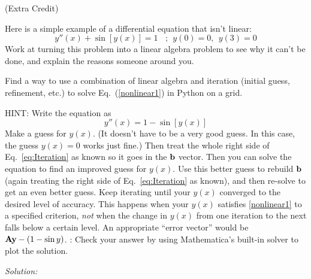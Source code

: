 \begin{enumerate}
\probtwo(Extra Credit) \label{P:2.4}
\begin{enumerate}
\subprob Here is a simple example of a differential equation
    that isn't linear: 
    \begin{equation}
        y''(x) + \sin{\left[y(x)\right]}=1~~~~;~~y(0)=0,~~y(3)=0
    \label{nonlinear1}
    \end{equation}
    Work at turning this problem into a linear algebra
    problem to see why it can't be done, and explain the
    reasons someone around you.


\subprob \label{P:2.4b} 

  Find a way to use a combination of linear algebra and iteration
  (initial guess, refinement, etc.) to solve Eq.~(\ref{nonlinear1}) in
  Python on a grid. 

    HINT: Write the equation as
    \begin{equation}\label{eq:Iteration}
        y''(x) = 1 - \sin \left[y(x)\right]
    \end{equation}
    Make a guess for $y(x)$. (It doesn't have to be a very good
    guess. In this case, the guess $y(x)=0$ works just fine.) Then
    treat the whole right side of Eq.~\eqref{eq:Iteration} as known so
    it goes in the $\bf b$ vector. Then you can solve the equation to
    find an improved guess for $y(x)$.  Use this better guess to
    rebuild $\bf b$ (again treating the right side of
    Eq.~\eqref{eq:Iteration} as known), and then re-solve to get an
    even better guess. Keep iterating until your $y(x)$ converged to
    the desired level of accuracy. This happens when your $y(x)$
    satisfies \eqref{nonlinear1} to a specified criterion, \emph{not}
    when the change in $y(x)$ from one iteration to the next falls
    below a certain level. An appropriate ``error vector'' would be
    ${\bf A y} -(1-\sin y)$.
\subprob:  Check your answer by using Mathematica's built-in
  solver to plot the solution.
\end{enumerate}
\end{enumerate}
\ifsolutions
\textit{Solution:}\\
